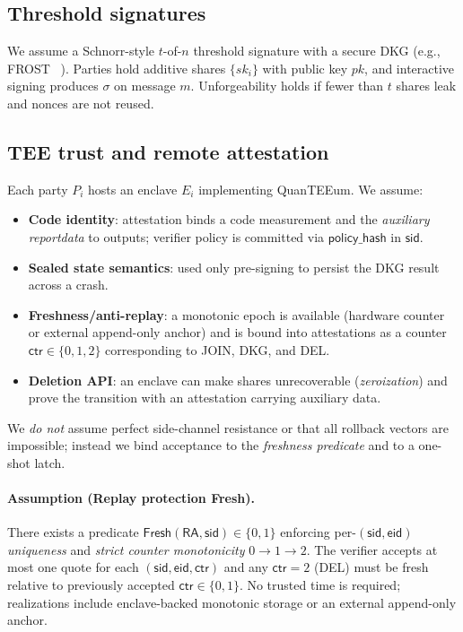 \documentclass[runningheads,orivec]{llncs}
\newcommand{\prot}{\textsf{QuanTEEum}}
\begin{document}
\subsection{Threshold signatures}
We assume a Schnorr-style $t$-of-$n$ threshold signature with a secure DKG (e.g., FROST ~\cite{komlo2020frost}). Parties hold additive shares $\{sk_i\}$ with public key $pk$, and interactive signing produces $\sigma$ on message $m$. Unforgeability holds if fewer than $t$ shares leak and nonces are not reused.

\subsection{TEE trust and remote attestation}
Each party $P_i$ hosts an enclave $E_i$ implementing \prot{}. We assume:
\begin{itemize}[leftmargin=*,itemsep=0.25em]
  \item \textbf{Code identity}: attestation binds a code measurement and the \emph{auxiliary reportdata} to outputs; verifier policy is committed via $\mathsf{policy\_hash}$ in $\mathsf{sid}$.
  \item \textbf{Sealed state semantics}: used only pre-signing to persist the DKG result across a crash.
  \item \textbf{Freshness/anti-replay}: a monotonic epoch is available (hardware counter or external append-only anchor) and is bound into attestations as a counter $\mathsf{ctr}\in\{0,1,2\}$ corresponding to JOIN, DKG, and DEL.
  \item \textbf{Deletion API}: an enclave can make shares unrecoverable (\emph{zeroization}) and prove the transition with an attestation carrying auxiliary data.
\end{itemize}
We \emph{do not} assume perfect side-channel resistance or that all rollback vectors are impossible; instead we bind acceptance to the \emph{freshness predicate} and to a one-shot latch.

\paragraph{Assumption (Replay protection \textsf{Fresh}).}
There exists a predicate $\textsf{Fresh}(\mathsf{RA},\mathsf{sid})\!\in\!\{0,1\}$ enforcing per-$(\mathsf{sid},\mathsf{eid})$ \emph{uniqueness} and \emph{strict counter monotonicity} $0\!\rightarrow\!1\!\rightarrow\!2$. The verifier accepts at most one quote for each $(\mathsf{sid},\mathsf{eid},\mathsf{ctr})$ and any $\mathsf{ctr}{=}2$ (DEL) must be fresh relative to previously accepted $\mathsf{ctr}\in\{0,1\}$. No trusted time is required; realizations include enclave-backed monotonic storage or an external append-only anchor.
\end{document}
